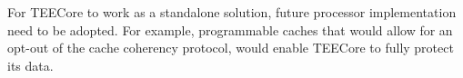 For TEECore to work as a standalone solution, future processor implementation
need to be adopted. For example, programmable caches that would allow for an
opt-out of the cache coherency protocol, would enable TEECore to fully protect
its data.


